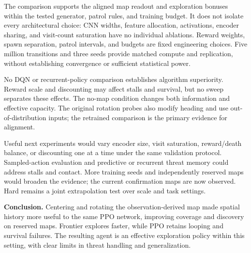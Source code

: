 \documentclass[10pt,a4paper]{article}
\newcommand{\heading}[1]{\vspace{5pt}{\large\bfseries\color{ink}#1}\par\vspace{1pt}}
\begin{document}
\heading{10\quad Limitations and future work}
The comparison supports the aligned map readout and exploration bonuses within the tested generator, patrol rules, and training budget. It does not isolate every architectural choice: CNN widths, feature allocation, activations, encoder sharing, and visit-count saturation have no individual ablations. Reward weights, spawn separation, patrol intervals, and budgets are fixed engineering choices. Five million transitions and three seeds provide matched compute and replication, without establishing convergence or sufficient statistical power.

No DQN or recurrent-policy comparison establishes algorithm superiority. Reward scale and discounting may affect stalls and survival, but no sweep separates these effects. The no-map condition changes both information and effective capacity. The original rotation probes also modify heading and use out-of-distribution inputs; the retrained comparison is the primary evidence for alignment.

Useful next experiments would vary encoder size, visit saturation, reward/death balance, or discounting one at a time under the same validation protocol. Sampled-action evaluation and predictive or recurrent threat memory could address stalls and contact. More training seeds and independently reserved maps would broaden the evidence; the current confirmation maps are now observed. Hard remains a joint extrapolation test over scale and task settings.

\textbf{Conclusion.} Centering and rotating the observation-derived map made spatial history more useful to the same PPO network, improving coverage and discovery on reserved maps. Frontier explores faster, while PPO retains looping and survival failures. The resulting agent is an effective exploration policy within this setting, with clear limits in threat handling and generalization.

{\footnotesize
\setlength{\parskip}{1pt}


}
\end{document}
